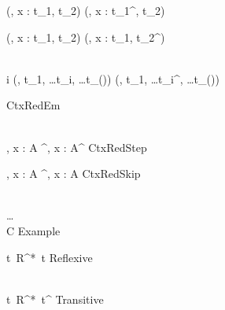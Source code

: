 
\Rule{\BinderReductionOne}
    {
    }
    {(\kappa, x : t_1, t_2) \betared {}(\kappa, x : t_1^\prime, t_2) }
    {}

\Rule{\BinderReductionTwo}
    {
    }
    {(\kappa, x : t_1, t_2) \betared {}(\kappa, x : t_1, t_2^\prime) }
    {}

\Rule{\NonbinderReduction}
    {
         \\
        i 
    }
    {(\kappa, t_1, \ldots t_i, \ldots t_{(\kappa)}) \betared {}(\kappa, t_1, \ldots t_i^\prime, \ldots t_{(\kappa)}) }
    {}

\Rule{\ContextReductionEmpty}
    {
    }
    {\varepsilon \betared \varepsilon}
    {CtxRedEm}

\Rule{\ContextReductionStep}
    {
         \\
    }
    {\Gamma, x : A \betared \Gamma^\prime, x : A^\prime}
    {CtxRedStep}

\Rule{\ContextReductionSkip}
    {
    }
    {\Gamma, x : A \betared \Gamma^\prime, x : A}
    {CtxRedSkip}

\Rule{\ExampleRule}
    {
        \\ \ldots
        \\ 
    }
    {C}
    {Example}

\Rule{\MultiRefl}
    {\color{white}{\_}}
    {t\ R^*\ t}
    {Reflexive}

\Rule{\MultiStep}
    {
         \\
    }
    {t\ R^*\ t^{\prime\prime}}
    {Transitive}
